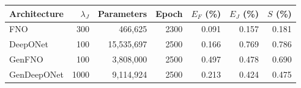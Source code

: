 \begin{tabular}{lrrrrrr}
\toprule
Architecture & $\lambda_J$ & Parameters & Epoch & $E_F$ (\%) & $E_J$ (\%) & $S$ (\%) \\
\midrule
FNO & 300 & 466,625 & 2300 & 0.091 & 0.157 & 0.181 \\
DeepONet & 100 & 15,535,697 & 2500 & 0.166 & 0.769 & 0.786 \\
GenFNO & 100 & 3,808,000 & 2500 & 0.497 & 0.478 & 0.690 \\
GenDeepONet & 1000 & 9,114,924 & 2500 & 0.213 & 0.424 & 0.475 \\
\bottomrule
\end{tabular}
